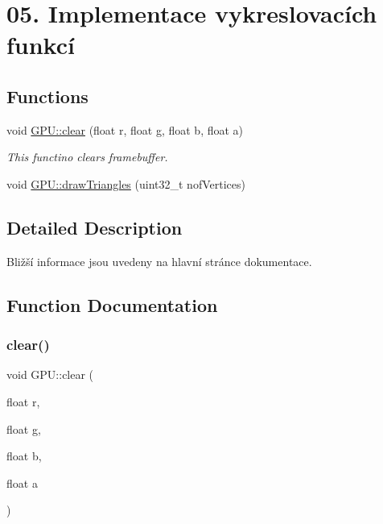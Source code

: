\hypertarget{group__draw__tasks}{}\section{05. Implementace vykreslovacích funkcí}
\label{group__draw__tasks}
\subsection*{Functions}
\begin{DoxyCompactItemize}
\item 
void \hyperlink{group__draw__tasks_ga012ff10197fb3e5051b854a0028db31d}{G\+P\+U\+::clear} (float r, float g, float b, float a)
\begin{DoxyCompactList}\small\item\em This functino clears framebuffer. \end{DoxyCompactList}\item 
void \hyperlink{group__draw__tasks_ga127436afbcbda852746dfb9dae885ecf}{G\+P\+U\+::draw\+Triangles} (uint32\+\_\+t nof\+Vertices)
\end{DoxyCompactItemize}


\subsection{Detailed Description}
Bližší informace jsou uvedeny na hlavní stránce dokumentace. 

\subsection{Function Documentation}
\mbox{\label{group__draw__tasks_ga012ff10197fb3e5051b854a0028db31d}} 
\subsubsection{\texorpdfstring{clear()}{clear()}}
{\footnotesize\ttfamily void G\+P\+U\+::clear (\begin{DoxyParamCaption}\item[{float}]{r,  }\item[{float}]{g,  }\item[{float}]{b,  }\item[{float}]{a }\end{DoxyParamCaption})}



